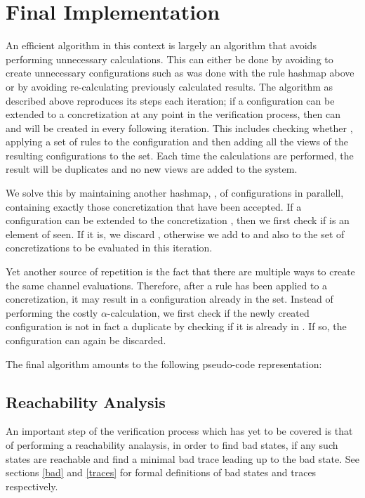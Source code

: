 \section{Final Implementation}
An efficient algorithm in this context is largely an algorithm that avoids performing unnecessary calculations. This can either be done by avoiding to create unnecessary configurations such as was done with the rule hashmap above or by avoiding re-calculating previously calculated results. The algorithm as described above reproduces its steps each iteration; if a configuration  can be extended to a concretization  at any point in the verification process, then  can and will be created in every following iteration. This includes checking whether , applying a set of rules to the configuration and then adding all the views of the resulting configurations to the set. Each time the calculations are performed, the result will be duplicates and no new views are added to the system.

We solve this by maintaining another hashmap, , of configurations in parallell, containing exactly those concretization that have been accepted. If a configuration  can be extended to the concretization , then we first check if  is an element of seen. If it is, we discard , otherwise we add  to  and also to the set of concretizations to be evaluated in this iteration.

Yet another source of repetition is the fact that there are multiple ways to create the same channel evaluations. Therefore, after a rule has been applied to a concretization, it may result in a configuration already in the set. Instead of performing the costly $\alpha$-calculation, we first check if the newly created configuration is not in fact a duplicate by checking if it is already in . If so, the configuration can again be discarded.

The final algorithm amounts to the following pseudo-code representation:

\subsection{Reachability Analysis}
An important step of the verification process which has yet to be covered is that of performing a reachability analaysis, in order to find bad states, if any such states are reachable and find a minimal bad trace leading up to the bad state. See sections \ref{bad} and \ref{traces} for formal definitions of bad states and traces respectively.

